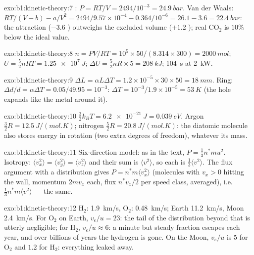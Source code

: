 \begin{solution}{exo:b1:kinetic-theory:7}
: $P = RT/V = 2494/10^{-3} = \qty{24.9}{bar}$. Van der Waals:
$RT/(V - b) - a/V^2 = 2494/9.57\times10^{-4} - 0.364/10^{-6} = 26.1 - 3.6 =
\qty{22.4}{bar}$: the attraction ($-3.6$ ) outweighs the excluded
volume ($+1.2$ ); real CO$_2$ is $10\%$ below the ideal value.
\end{solution}

\begin{solution}{exo:b1:kinetic-theory:8}
$n = PV/RT = 10^5 \times 50/(8.314 \times 300) = \qty{2000}{mol}$; $U = \tfrac52
nRT = \qty{1.25e7}{J}$; $\Delta U = \tfrac52 nR \times 5 = \qty{208}{kJ}$;
\qty{104}{s} at \qty{2}{kW}.
\end{solution}

\begin{solution}{exo:b1:kinetic-theory:9}
$\Delta L = \alpha L\Delta T = 1.2\times10^{-5} \times 30 \times 50 = \qty{18}{mm}$.
Ring: $\Delta d/d = \alpha\Delta T = 0.05/49.95 = 10^{-3}$: $\Delta T = 10^{-3}/
1.9\times10^{-5} = \qty{53}{K}$ (the hole expands like the metal around it).
\end{solution}

\begin{solution}{exo:b1:kinetic-theory:10}
$\tfrac32 k_BT = \qty{6.2e-21}{J} = \qty{0.039}{eV}$. Argon $\tfrac32 R =
\qty{12.5}{J/(mol.K)}$; nitrogen $\tfrac52 R = \qty{20.8}{J/(mol.K)}$: the
diatomic molecule also stores energy in rotation (two extra degrees of
freedom), whatever its mass.
\end{solution}

\begin{solution}{exo:b1:kinetic-theory:11}
Six-direction model: as in the text, $P = \tfrac13 n^*mu^2$. Isotropy:
$\langle v_x^2\rangle = \langle v_y^2\rangle = \langle v_z^2\rangle$ and their
sum is $\langle v^2\rangle$, so each is $\tfrac13\langle v^2\rangle$. The flux
argument with a distribution gives $P = n^*m\langle v_x^2\rangle$ (molecules
with $v_x > 0$ hitting the wall, momentum $2mv_x$ each, flux $n^*v_x/2$ per
speed class, averaged), i.e.\ $\tfrac13 n^*m\langle v^2\rangle$ --- the same.
\end{solution}

\begin{solution}{exo:b1:kinetic-theory:12}
H$_2$: \qty{1.9}{km/s}, O$_2$: \qty{0.48}{km/s}; Earth \qty{11.2}{km/s}, Moon
\qty{2.4}{km/s}. For O$_2$ on Earth, $v_e/u = 23$: the tail of the
distribution beyond that is utterly negligible; for H$_2$, $v_e/u \approx 6$:
a minute but steady fraction escapes each year, and over billions of
years the hydrogen is gone. On the Moon, $v_e/u$ is $5$ for O$_2$ and
$1.2$ for H$_2$: everything leaked away.
\end{solution}

